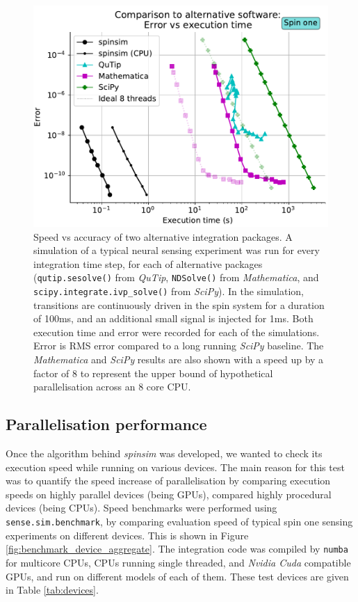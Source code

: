 \documentclass{jors}
\begin{document}
		\begin{figure}[h!]
			\includegraphics[scale=0.9]{benchmark_external_execution_error.pdf}
			\caption{Speed vs accuracy of two alternative integration packages.
			A simulation of a typical neural sensing experiment was run for every integration time step, for each of alternative packages (\texttt{qutip.sesolve()} from \emph{QuTip}, \texttt{NDSolve()} from \emph{Mathematica}, and \texttt{scipy.integrate.ivp\_solve()} from \emph{SciPy}).
			In the simulation, transitions are continuously driven in the spin system for a duration of 100ms, and an additional small signal is injected for 1ms.
			Both execution time and error were recorded for each of the simulations.
			Error is RMS error compared to a long running \emph{SciPy} baseline.
			The \emph{Mathematica} and \emph{SciPy} results are also shown with a speed up by a factor of 8 to represent the upper bound of hypothetical parallelisation across an 8 core CPU.}
			\label{fig:benchmark_external}
		\end{figure}

	\subsection{Parallelisation performance}
		Once the algorithm behind \emph{spinsim} was developed, we wanted to check its execution speed while running on various devices.
		The main reason for this test was to quantify the speed increase of parallelisation by comparing execution speeds on highly parallel devices (being GPUs), compared highly procedural devices (being CPUs).
		Speed benchmarks were performed using \texttt{sense.sim.benchmark}, by comparing evaluation speed of typical spin one sensing experiments on different devices.
		This is shown in Figure \ref{fig:benchmark_device_aggregate}.
		The integration code was compiled by \texttt{numba} for multicore CPUs, CPUs running single threaded, and \emph{Nvidia Cuda} compatible GPUs, and run on different models of each of them.
		These test devices are given in Table \ref{tab:devices}.
\end{document}
